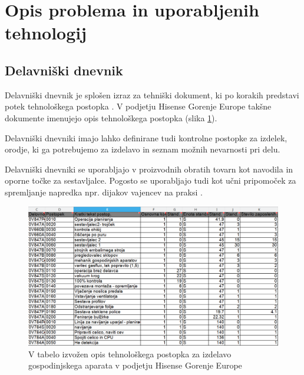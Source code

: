 \documentclass[a4paper, 12pt]{book}
\begin{document}
\section{Opis problema in uporabljenih tehnologij}

\subsection {Delavniški dnevnik}

Delavniški dnevnik je splošen izraz za tehniški dokument, ki po korakih predstavi potek tehnološkega postopka \cite{delavniskidnevnikptuj}.
V podjetju Hisense Gorenje Europe takšne dokumente imenujejo opis tehnološkega postopka (slika \ref{sap_2}).


Delavniški dnevniki imajo lahko definirane tudi kontrolne postopke za izdelek, orodje, ki ga potrebujemo za izdelavo in seznam možnih nevarnosti pri delu.

Delavniški dnevniki se uporabljajo v proizvodnih obratih tovarn kot navodila in oporne točke za sestavljalce.
Pogosto se uporabljajo tudi kot učni pripomoček za spremljanje napredka npr. dijakov vajencev na praksi \cite{delavniskidnevnikptuj, ddsclj}.

\begin{figure}[H]
\begin{center}
\includegraphics[width=13.5cm]{sap_2}
\end{center}
\caption{V tabelo izvožen opis tehnološkega postopka za izdelavo gospodinjskega aparata v podjetju Hisense Gorenje Europe}
\label{sap_2}
\end{figure}
\end{document}
